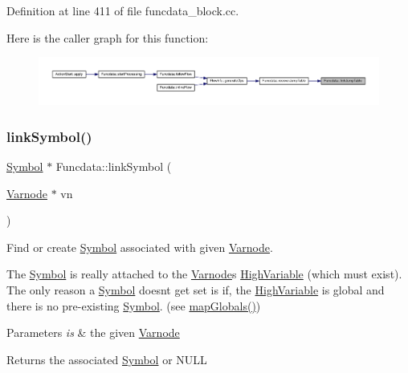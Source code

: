 Definition at line 411 of file funcdata\+\_\+block.\+cc.

Here is the caller graph for this function\+:
\nopagebreak
\begin{figure}[H]
\begin{center}
\leavevmode
\includegraphics[width=350pt]{class_funcdata_a512f5823b1a33e9430584067d77a52c5_icgraph}
\end{center}
\end{figure}
\mbox{\label{class_funcdata_afbb3bc5ac9e2c09eda544db34b8f5879}} 
\subsubsection{\texorpdfstring{linkSymbol()}{linkSymbol()}}
{\footnotesize\ttfamily \mbox{\hyperlink{class_symbol}{Symbol}} $\ast$ Funcdata\+::link\+Symbol (\begin{DoxyParamCaption}\item[{\mbox{\hyperlink{class_varnode}{Varnode}} $\ast$}]{vn }\end{DoxyParamCaption})}



Find or create \mbox{\hyperlink{class_symbol}{Symbol}} associated with given \mbox{\hyperlink{class_varnode}{Varnode}}. 

The \mbox{\hyperlink{class_symbol}{Symbol}} is really attached to the \mbox{\hyperlink{class_varnode}{Varnode}}\textquotesingle{}s \mbox{\hyperlink{class_high_variable}{High\+Variable}} (which must exist). The only reason a \mbox{\hyperlink{class_symbol}{Symbol}} doesn\textquotesingle{}t get set is if, the \mbox{\hyperlink{class_high_variable}{High\+Variable}} is global and there is no pre-\/existing \mbox{\hyperlink{class_symbol}{Symbol}}. (see \mbox{\hyperlink{class_funcdata_aed6aefa7321e887e3b759de94e4d3d4f}{map\+Globals()}}) 
\begin{DoxyParams}{Parameters}
{\em is} & the given \mbox{\hyperlink{class_varnode}{Varnode}} \\
\hline
\end{DoxyParams}
\begin{DoxyReturn}{Returns}
the associated \mbox{\hyperlink{class_symbol}{Symbol}} or N\+U\+LL 
\end{DoxyReturn}


